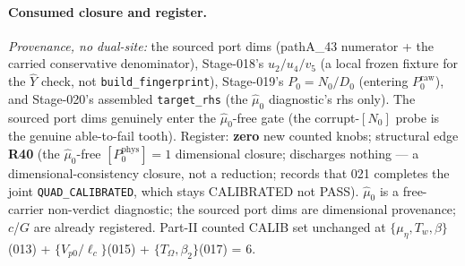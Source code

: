 \paragraph{Consumed closure and register.}
\emph{Provenance, no dual-site:} the sourced port dims (pathA\_43 numerator + the carried conservative denominator),
Stage-018's \(u_2/u_4/v_5\) (a local frozen fixture for the \(\hat Y\) check, not \texttt{build\_fingerprint}), Stage-019's
\(P_0=N_0/D_0\) (entering \(P_0^{\mathrm{raw}}\)), and Stage-020's assembled \texttt{target\_rhs} (the \(\hat\mu_0\)
diagnostic's rhs only). The sourced port dims genuinely enter the \(\hat\mu_0\)-free gate (the corrupt-\([N_0]\) probe is the
genuine able-to-fail tooth). Register: \textbf{zero} new counted knobs; structural edge \textbf{R40} (the \(\hat\mu_0\)-free
\([P_0^{\mathrm{phys}}]=1\) dimensional closure; discharges nothing --- a dimensional-consistency closure, not a reduction;
records that 021 completes the joint \texttt{QUAD\_CALIBRATED}, which stays CALIBRATED not PASS). \(\hat\mu_0\) is a
free-carrier non-verdict diagnostic; the sourced port dims are dimensional provenance; \(c\)/\(G\) are already registered.
Part-II counted CALIB set unchanged at \(\{\mu_\eta,T_w,\beta\}\)(013) + \(\{V_{p0}/\ell_c\}\)(015) +
\(\{T_\Omega,\beta_2\}\)(017) = 6.

